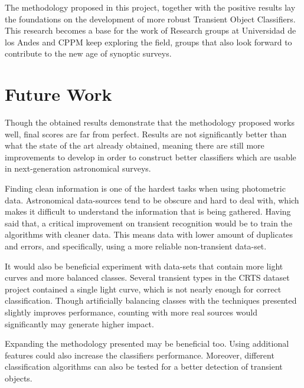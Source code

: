 The methodology proposed in this project, together with the positive results lay the foundations on the development of more robust Transient Object Classifiers. This research becomes a base for the work of Research groups at Universidad de los Andes and CPPM keep exploring the field, groups that also look forward to contribute to the new age of synoptic surveys.





\section{Future Work} \label{future_work}

Though the obtained results demonstrate that the methodology proposed works well, final scores are far from perfect. Results are not significantly better than what the state of the art already obtained, meaning there are still more improvements to develop in order to construct better classifiers which are usable in next-generation astronomical surveys. 

Finding clean information is one of the hardest tasks when using photometric data. Astronomical data-sources tend to be obscure and hard to deal with, which makes it difficult to understand the information that is being gathered. Having said that, a critical improvement on transient recognition would be to train the algorithms with cleaner data. This means data with lower amount of duplicates and errors, and specifically, using a more reliable non-transient data-set. 

It would also be beneficial experiment with data-sets that contain more light curves and more balanced classes. Several transient types in the CRTS dataset project contained a single light curve, which is not nearly enough for correct classification. Though artificially balancing classes with the techniques presented slightly improves performance, counting with more real sources would significantly may generate higher impact.

Expanding the methodology presented may be beneficial too. Using additional features could also increase the classifiers performance. Moreover, different classification algorithms can also be tested for a better detection of transient objects.
